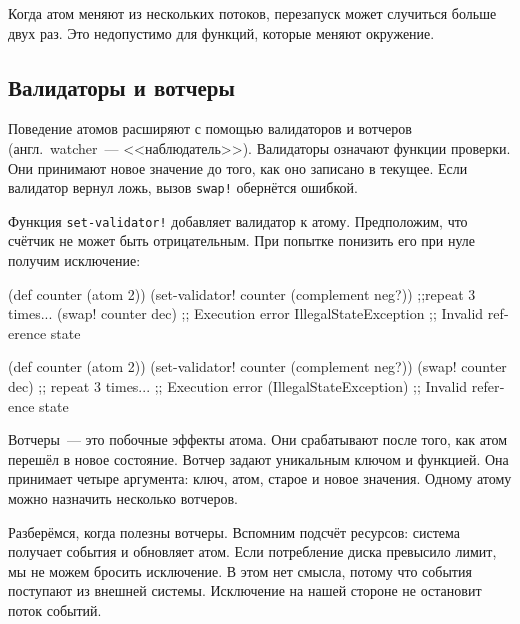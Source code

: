 Когда атом меняют из нескольких потоков, перезапуск может случиться больше двух
раз. Это недопустимо для функций, которые меняют окружение.

\subsection{Валидаторы и вотчеры}


Поведение атомов расширяют с помощью валидаторов и вотчеров (англ.~watcher~---
<<наблюдатель>>). Валидаторы означают функции проверки. Они принимают новое
значение до того, как оно записано в текущее. Если валидатор вернул ложь, вызов
\verb|swap!| обернётся ошибкой.


Функция \verb|set-validator!| добавляет валидатор к атому. Предположим, что
счётчик не может быть отрицательным. При попытке понизить его при нуле получим
исключение:

\ifnarrow

\begin{english}
  \begin{clojure}
(def counter (atom 2))
(set-validator!
  counter (complement neg?))
;;repeat 3 times...
(swap! counter dec)
;; Execution error IllegalStateException
;; Invalid reference state
  \end{clojure}
\end{english}

\else

\begin{english}
  \begin{clojure}
(def counter (atom 2))
(set-validator! counter (complement neg?))
(swap! counter dec) ;; repeat 3 times...
;; Execution error (IllegalStateException)
;; Invalid reference state
  \end{clojure}
\end{english}

\fi

Вотчеры~--- это побочные эффекты атома. Они срабатывают после того, как атом
перешёл в новое состояние. Вотчер задают уникальным ключом и функцией. Она
принимает четыре аргумента: ключ, атом, старое и новое значения. Одному атому
можно назначить несколько вотчеров.

Разберёмся, когда полезны вотчеры. Вспомним подсчёт ресурсов: система получает
события и обновляет атом. Если потребление диска превысило лимит, мы не можем
бросить исключение. В этом нет смысла, потому что события поступают из внешней
системы. Исключение на нашей стороне не остановит поток событий.

